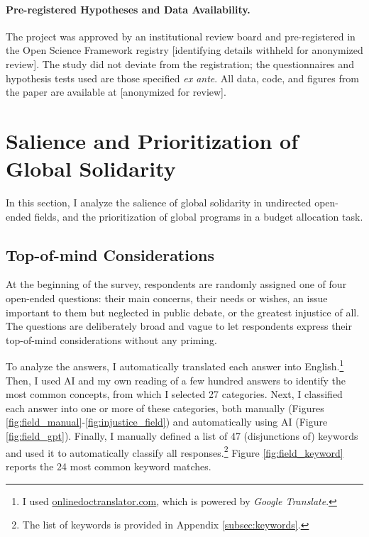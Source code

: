 \documentclass[12pt,english]{article}
\begin{document}
\paragraph{Pre-registered Hypotheses and Data Availability.}
The project was approved by an institutional review board and pre-registered in the Open Science Framework registry [identifying details withheld for anonymized review]. %
The study did not deviate from the registration; the questionnaires and hypothesis tests used are those specified \textit{ex ante}. All data, code, and figures  from the paper are available at [anonymized for review]. %


\section{Salience and Prioritization of Global Solidarity\label{sec:salience}}
In this section, I analyze the salience of global solidarity in undirected open-ended fields, and the prioritization of global programs in a budget allocation task.

\subsection{Top-of-mind Considerations}\label{subsec:considerations}

At the beginning of the survey, respondents are randomly assigned one of four open-ended questions: their main concerns, their needs or wishes, an issue important to them but neglected in public debate, or the greatest injustice of all. The questions are deliberately broad and vague to let respondents express their top-of-mind considerations without any priming. 

To analyze the answers, I automatically translated each answer into English.\footnote{I used \href{https://www.onlinedoctranslator.com/en/translationform}{onlinedoctranslator.com}, which is powered by \textit{Google Translate}.} 
Then, I used AI and my own reading of a few hundred answers to identify the most common concepts, from which I selected 27 categories. Next, I classified each answer into one or more of these categories, both manually (Figures \ref{fig:field_manual}-\ref{fig:injustice_field}) and automatically using AI (Figure \ref{fig:field_gpt}). Finally, I manually defined a list of 47 (disjunctions of) keywords and used it to automatically classify all responses.\footnote{The list of keywords is provided in Appendix \ref{subsec:keywords}.} Figure \ref{fig:field_keyword} reports the 24 most common keyword matches. 
\end{document}
